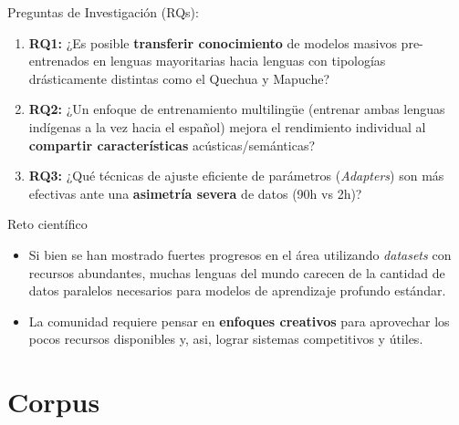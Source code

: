 \documentclass[11pt]{beamer}
\begin{document}
\begin{frame}{Preguntas de Investigación (RQs):}

\begin{enumerate}
    \item <1-> \textbf{RQ1:} ¿Es posible \textbf{transferir conocimiento} de modelos masivos pre-entrenados en lenguas mayoritarias hacia lenguas con tipologías drásticamente distintas como el Quechua y Mapuche?
    \item <2-> \textbf{RQ2:} ¿Un enfoque de entrenamiento multilingüe (entrenar ambas lenguas indígenas a la vez hacia el español) mejora el rendimiento individual al \textbf{compartir características} acústicas/semánticas?
    \item <3-> \textbf{RQ3:} ¿Qué técnicas de ajuste eficiente de parámetros (\textit{Adapters}) son más efectivas ante una \textbf{asimetría severa} de datos (90h vs 2h)?
\end{enumerate}

\end{frame}

\begin{frame}{Reto científico}

\begin{itemize}
    \item <1-> Si bien se han mostrado fuertes progresos en el área utilizando \textit{datasets} con recursos abundantes, muchas lenguas del mundo carecen de la cantidad de datos paralelos necesarios para modelos de aprendizaje profundo estándar.
    \item <2-> La comunidad requiere pensar en \textbf{enfoques creativos} para aprovechar los pocos recursos disponibles y, asi, lograr sistemas competitivos y útiles.
\end{itemize}

\end{frame}

\section{Corpus}
\end{document}
